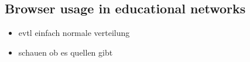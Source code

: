 %


\subsection{Browser usage in educational networks}

\begin{itemize}
	\item evtl einfach normale verteilung
	\item schauen ob es quellen gibt
\end{itemize}


